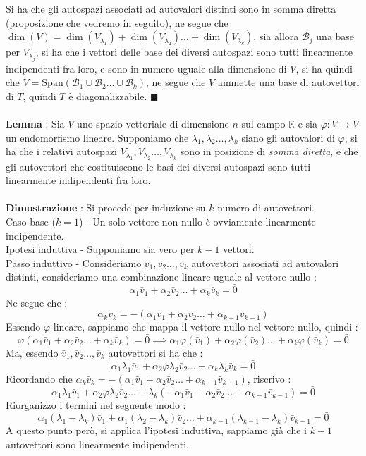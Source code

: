 \documentclass[12pt, letterpaper]{article}
\newcommand{\K}{{\mathbb K}}
\newcommand{\B}{{\mathcal B}}
\newcommand{\ve}{{\bar v}}
\newcommand{\acc}{\\\hphantom{}\\}
\newcommand{\Span}{{\text{Span}}}
\begin{document}
Si ha che gli autospazi associati ad autovalori distinti sono in somma diretta (proposizione che vedremo in 
seguito), ne segue che \(\dim(V)=\dim(V_{\lambda_1})+\dim(V_{\lambda_2})\dots+\dim(V_{\lambda_k})\), sia 
allora \(\B_j\) una base per \(V_{\lambda_j}\), si ha che i vettori delle base dei diversi autospazi sono tutti 
linearmente indipendenti fra loro, e sono in numero uguale alla dimensione di \(V\), si ha quindi che 
\(V=\Span(\B_1\cup \B_2\dots \cup \B_k)\), ne segue che \(V\) ammette una base di autovettori di \(T\), quindi 
\(T\) è diagonalizzabile. \(\blacksquare\)\acc 
\textbf{Lemma} : Sia \(V\) uno spazio vettoriale di dimensione \(n\) sul campo \(\K\)  e sia \(\varphi:V\rightarrow V\) un endomorfismo 
lineare. Supponiamo che \(\lambda_1,\lambda_2\dots,\lambda_k\) siano gli autovalori di \(\varphi\), si ha che i 
relativi autospazi \(V_{\lambda_1},V_{\lambda_2}\dots ,V_{\lambda_k}\) sono in posizione di \textit{somma diretta}, e che 
gli autovettori che costituiscono le basi dei diversi autospazi sono tutti linearmente indipendenti fra loro.\acc
\textbf{Dimostrazione} : Si procede per induzione su \(k\) numero di autovettori.\\
Caso base (\(k=1\)) - Un solo vettore non nullo è ovviamente linearmente indipendente.\\
Ipotesi induttiva - Supponiamo sia vero per \(k-1\) vettori.\\
Passo induttivo - Consideriamo \(\ve_1,\ve_2\dots,\ve_k\) autovettori associati ad autovalori distinti, consideriamo una combinazione
lineare uguale al vettore nullo :$$\alpha_1\ve_1+\alpha_2\ve_2\dots+\alpha_k\ve_k=\bar 0$$
Ne segue che : 
$$\alpha_k\ve_k=-(\alpha_1\ve_1+\alpha_2\ve_2\dots+\alpha_{k-1}\ve_{k-1})$$
Essendo \(\varphi\) lineare, sappiamo che mappa il vettore nullo nel vettore nullo, quindi : 
$$\varphi(\alpha_1\ve_1+\alpha_2\ve_2\dots+\alpha_k\ve_k)=\bar 0\implies \alpha_1\varphi(\ve_1)+\alpha_2\varphi(\ve_2)\dots 
+\alpha_k\varphi(\ve_k)=\bar 0$$
Ma, essendo \(\ve_1,\ve_2\dots,\ve_k\) autovettori si ha che : 
$$\alpha_1\lambda_1\ve_1+\alpha_2\varphi\lambda_2\ve_2\dots +\alpha_k\lambda_k\ve_k=\bar 0$$
Ricordando che \(\alpha_k\ve_k=-(\alpha_1\ve_1+\alpha_2\ve_2\dots+\alpha_{k-1}\ve_{k-1})\), riscrivo : 
$$\alpha_1\lambda_1\ve_1+\alpha_2\varphi\lambda_2\ve_2\dots +\lambda_k(-\alpha_1\ve_1-\alpha_2\ve_2\dots-\alpha_{k-1}\ve_{k-1})=\bar 0$$
Riorganizzo i termini nel seguente modo : 
$$\alpha_1(\lambda_1-\lambda_k)\ve_1+\alpha_1(\lambda_2-\lambda_k)\ve_2\dots+\alpha_{k-1}(\lambda_{k-1}-\lambda_k)\ve_{k-1}=\bar 0$$
A questo punto però, si applica l'ipotesi induttiva, sappiamo già che i \(k-1\) autovettori sono linearmente indipendenti, 
\end{document}
